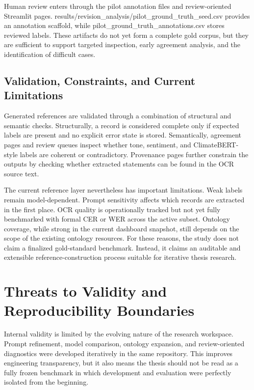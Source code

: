 \documentclass[english, online, cse, master]{dithesis}
\begin{document}
Human review enters through the pilot annotation files and review-oriented Streamlit pages. results/revision\_analysis/pilot\_ground\_truth\_seed.csv provides an annotation scaffold, while pilot\_ground\_truth\_annotations.csv stores reviewed labels. These artifacts do not yet form a complete gold corpus, but they are sufficient to support targeted inspection, early agreement analysis, and the identification of difficult cases.

\subsection{Validation, Constraints, and Current Limitations}

Generated references are validated through a combination of structural and semantic checks. Structurally, a record is considered complete only if expected labels are present and no explicit error state is stored. Semantically, agreement pages and review queues inspect whether tone, sentiment, and ClimateBERT-style labels are coherent or contradictory. Provenance pages further constrain the outputs by checking whether extracted statements can be found in the OCR source text.

The current reference layer nevertheless has important limitations. Weak labels remain model-dependent. Prompt sensitivity affects which records are extracted in the first place. OCR quality is operationally tracked but not yet fully benchmarked with formal CER or WER across the active subset. Ontology coverage, while strong in the current dashboard snapshot, still depends on the scope of the existing ontology resources. For these reasons, the study does not claim a finalized gold-standard benchmark. Instead, it claims an auditable and extensible reference-construction process suitable for iterative thesis research.

\section{Threats to Validity and Reproducibility Boundaries}

Internal validity is limited by the evolving nature of the research workspace. Prompt refinement, model comparison, ontology expansion, and review-oriented diagnostics were developed iteratively in the same repository. This improves engineering transparency, but it also means the thesis should not be read as a fully frozen benchmark in which development and evaluation were perfectly isolated from the beginning.
\end{document}
